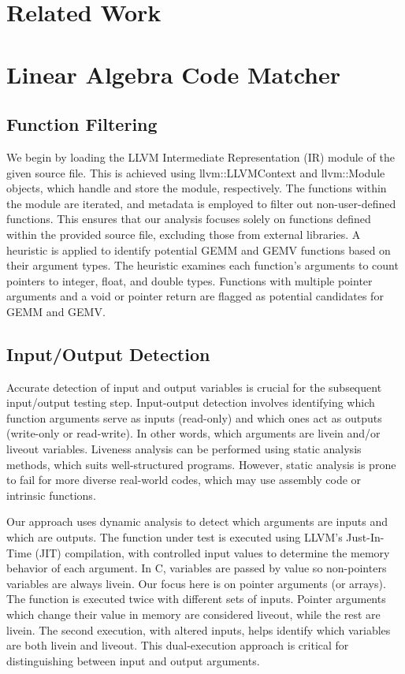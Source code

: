 \documentclass[manuscript,screen,review]{acmart}
\begin{document}
\section{Related Work}

\section{Linear Algebra Code Matcher}
\subsection{Function Filtering}
We begin by loading the LLVM Intermediate Representation (IR) module of the given source file. This is achieved using llvm::LLVMContext and llvm::Module objects, which handle and store the module, respectively. The functions within the module are iterated, and metadata is employed to filter out non-user-defined functions. This ensures that our analysis focuses solely on functions defined within the provided source file, excluding those from external libraries. A heuristic is applied to identify potential GEMM and GEMV functions based on their argument types. The heuristic examines each function’s arguments to count pointers to integer, float, and double types. Functions with multiple pointer arguments and a void or pointer return are flagged as potential candidates for GEMM and GEMV.


\subsection{Input/Output Detection}
Accurate detection of input and output variables is crucial for the subsequent input/output testing step. Input-output detection involves identifying which function arguments serve as inputs (read-only) and which ones act as outputs (write-only or read-write). In other words, which arguments are livein and/or liveout variables. Liveness analysis can be performed using static analysis methods, which suits well-structured programs. However, static analysis is prone to fail for more diverse real-world codes, which may use assembly code or intrinsic functions.

Our approach uses dynamic analysis to detect which arguments are inputs and which are outputs. The function under test is executed using LLVM's Just-In-Time (JIT) compilation, with controlled input values to determine the memory behavior of each argument. In C, variables are passed by value so non-pointers variables are always livein. Our focus here is on pointer arguments (or arrays). The function is executed twice with different sets of inputs. Pointer arguments which change their value in memory are considered liveout, while the rest are livein. The second execution, with altered inputs, helps identify which variables are both livein and liveout. This dual-execution approach is critical for distinguishing between input and output arguments.
\end{document}
